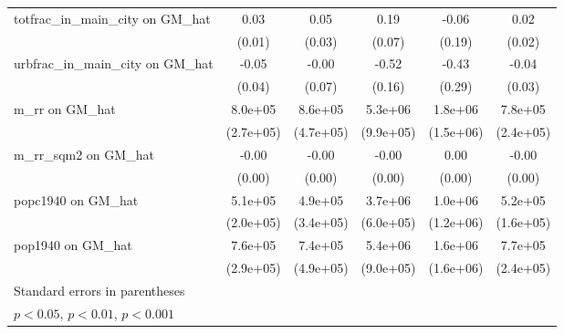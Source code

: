 \begin{table}[htbp]
\begin{tabular}{l*{5}{c}}
\addlinespace
totfrac\_in\_main\_city on GM\_hat&     0.03         &     0.05         &     0.19\sym{**} &    -0.06         &     0.02         \\
                &   (0.01)         &   (0.03)         &   (0.07)         &   (0.19)         &   (0.02)         \\
\addlinespace
urbfrac\_in\_main\_city on GM\_hat&    -0.05         &    -0.00         &    -0.52\sym{**} &    -0.43         &    -0.04         \\
                &   (0.04)         &   (0.07)         &   (0.16)         &   (0.29)         &   (0.03)         \\
\addlinespace
m\_rr on GM\_hat  &  8.0e+05\sym{**} &  8.6e+05         &  5.3e+06\sym{***}&  1.8e+06         &  7.8e+05\sym{**} \\
                &(2.7e+05)         &(4.7e+05)         &(9.9e+05)         &(1.5e+06)         &(2.4e+05)         \\
\addlinespace
m\_rr\_sqm2 on GM\_hat&    -0.00         &    -0.00         &    -0.00         &     0.00         &    -0.00         \\
                &   (0.00)         &   (0.00)         &   (0.00)         &   (0.00)         &   (0.00)         \\
\addlinespace
popc1940 on GM\_hat&  5.1e+05\sym{*}  &  4.9e+05         &  3.7e+06\sym{***}&  1.0e+06         &  5.2e+05\sym{**} \\
                &(2.0e+05)         &(3.4e+05)         &(6.0e+05)         &(1.2e+06)         &(1.6e+05)         \\
\addlinespace
pop1940 on GM\_hat&  7.6e+05\sym{**} &  7.4e+05         &  5.4e+06\sym{***}&  1.6e+06         &  7.7e+05\sym{**} \\
                &(2.9e+05)         &(4.9e+05)         &(9.0e+05)         &(1.6e+06)         &(2.4e+05)         \\
\bottomrule
\multicolumn{6}{l}{\footnotesize Standard errors in parentheses}\\
\multicolumn{6}{l}{\footnotesize \sym{*} \(p<0.05\), \sym{**} \(p<0.01\), \sym{***} \(p<0.001\)}\\
\end{tabular}
\end{table}
